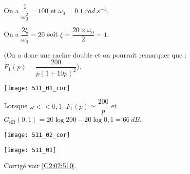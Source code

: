 \normaltrue \difficilefalse \tdifficilefalse
\correctionfalse


\setcounter{question}{0}
\ifcorrection
\else
{}
\fi


\ifprof 
\else
 \fi
 
\ifprof
On a $\dfrac{1}{\omega_0^2} = {100}$ et $\omega_0 = \SI{0,1}{rad.s^{-1}}$.

On a $\dfrac{2\xi}{\omega_0}= {20}$ soit $\xi = \dfrac{20\times \omega_0}{2 }= 1$.

(On a donc une racine double et on pourrait remarquer que : 
$F_1(p)=\dfrac{200}{p\left(1+10p\right)^2}$).

\begin{center}
\texttt{[image: 511\_01\_cor]}
\end{center}

Lorsque $\omega << 0,1$, $F_1(p) \simeq \dfrac{200}{p}$ et $G_{\text{dB}}(0,1) = 20\log 200 - 20 \log 0,1 = \SI{66}{dB}$.
\begin{center}
\texttt{[image: 511\_02\_cor]}
\end{center}

\else 
\begin{center}
\texttt{[image: 511\_01]}
\end{center}
\fi






 

\ifprof
\else
\begin{flushright}
\footnotesize{Corrigé  voir \ref{C2:02:510}.}
\end{flushright}%
\fi